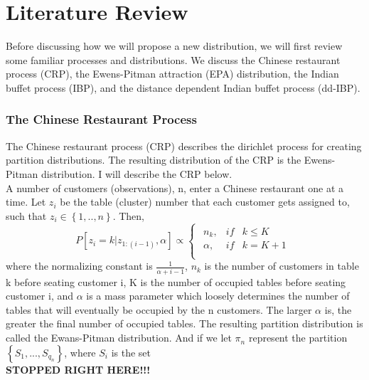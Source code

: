 

\chapter{Literature Review} %
Before discussing how we will propose a new distribution, we will first review 
some familiar processes and distributions. We discuss the Chinese restaurant 
process (CRP), the Ewens-Pitman attraction (EPA) distribution, %
the Indian buffet process (IBP), and the distance dependent Indian
buffet process (dd-IBP). 

\subsection{The Chinese Restaurant Process}
The Chinese restaurant process (CRP) describes the dirichlet process for
creating partition distributions. The resulting distribution of the CRP is the
Ewens-Pitman distribution. I will describe the CRP below.\\

\noindent
A number of customers (observations), n, enter a Chinese restaurant one at a
time. Let $z_i$ be the table (cluster) number that each customer gets assigned
to, such that $z_i \in \left\{ 1,..,n \right\}$. Then,
\begin{equation}
  P[z_i=k|z_{1:(i-1)},\alpha] \propto 
  \begin{cases}
    \begin{array}{rll}
      n_k,    & if & k \le K\\
      \alpha, & if & k = K+1\\
    \end{array}
  \end{cases}
\end{equation}
where the normalizing constant is $\frac{1}{\alpha+i-1}$, $n_k$ is the number
of customers in table k before seating customer i, K is the number of occupied 
tables before seating customer i, and $\alpha$ is a mass parameter which 
loosely determines the number of tables that will eventually be occupied by 
the n customers. The larger $\alpha$ is, the greater the final number of 
occupied tables. The resulting partition distribution is called the 
Ewans-Pitman distribution. And if we let $\pi_n$ represent the partition
$\left\{S_1,...,S_{q_n}\right\}$, where $S_i$ is the set \\
\textbf{STOPPED RIGHT HERE!!!}

